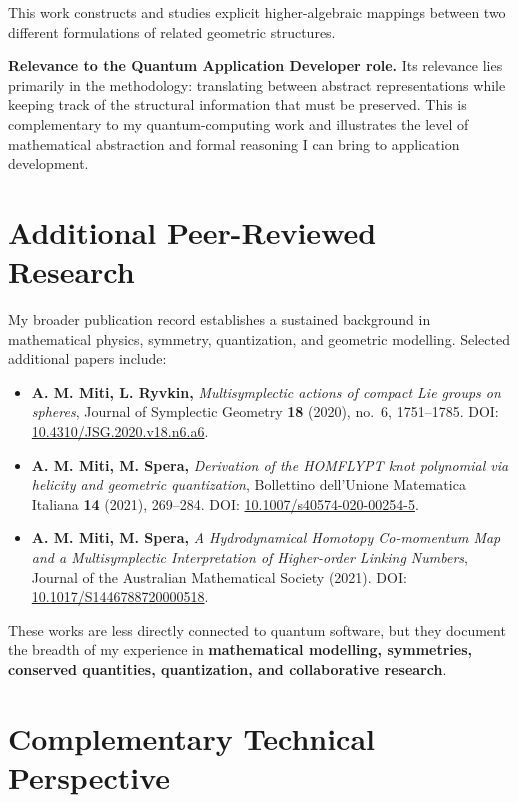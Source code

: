 \documentclass[10pt,a4paper]{article}
\newcommand{\relevance}[1]{\textbf{Relevance to the Quantum Application Developer role.} #1}
\begin{document}
This work constructs and studies explicit higher-algebraic mappings between two different formulations of related
geometric structures.

\relevance{Its relevance lies primarily in the methodology: translating between abstract representations while keeping
track of the structural information that must be preserved. This is complementary to my quantum-computing work and
illustrates the level of mathematical abstraction and formal reasoning I can bring to application development.}

\section*{Additional Peer-Reviewed Research}

My broader publication record establishes a sustained background in mathematical physics, symmetry, quantization, and
geometric modelling. Selected additional papers include:

\begin{itemize}
    \item \textbf{A. M. Miti, L. Ryvkin,}
    \textit{Multisymplectic actions of compact Lie groups on spheres},
    Journal of Symplectic Geometry \textbf{18} (2020), no.~6, 1751--1785.
    DOI: \href{https://doi.org/10.4310/JSG.2020.v18.n6.a6}{10.4310/JSG.2020.v18.n6.a6}.

    \item \textbf{A. M. Miti, M. Spera,}
    \textit{Derivation of the HOMFLYPT knot polynomial via helicity and geometric quantization},
    Bollettino dell'Unione Matematica Italiana \textbf{14} (2021), 269--284.
    DOI: \href{https://doi.org/10.1007/s40574-020-00254-5}{10.1007/s40574-020-00254-5}.

    \item \textbf{A. M. Miti, M. Spera,}
    \textit{A Hydrodynamical Homotopy Co-momentum Map and a Multisymplectic Interpretation of Higher-order Linking Numbers},
    Journal of the Australian Mathematical Society (2021).
    DOI: \href{https://doi.org/10.1017/S1446788720000518}{10.1017/S1446788720000518}.
\end{itemize}

These works are less directly connected to quantum software, but they document the breadth of my experience in
\textbf{mathematical modelling, symmetries, conserved quantities, quantization, and collaborative research}.

\section*{Complementary Technical Perspective}
\end{document}
